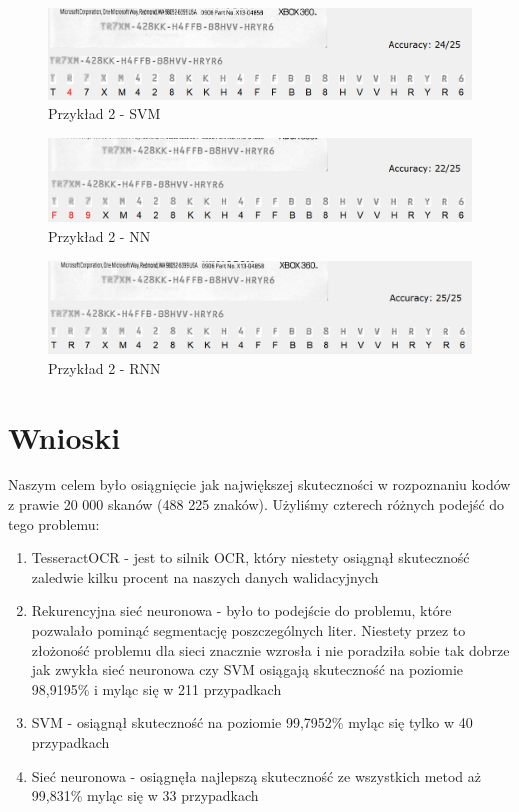 \documentclass[titlepage,10pt,a4paper]{article}
\begin{document}
{{{\begin{figure}[!htbp]
		\centering
		\caption{Przykład 2 - SVM}
		\vspace{1cm}
		\hspace*{-2.8cm}
		\includegraphics[scale=0.52]{sample2_svm.png}
	\end{figure}
	{\begin{figure}[!htbp]
			\centering
			\caption{Przykład 2 - NN}
			\vspace{1cm}
			\hspace*{-2.8cm}
			\includegraphics[scale=0.52]{sample2_nn.png}
		\end{figure}
	}
	{\begin{figure}[!htbp]
			\centering
			\caption{Przykład 2 - RNN}
			\vspace{1cm}
			\hspace*{-2.8cm}
			\includegraphics[scale=0.52]{sample2_rnn.png}
		\end{figure}
\pagebreak
\section{Wnioski}
Naszym celem było osiągnięcie jak największej skuteczności w rozpoznaniu kodów z prawie 20 000 skanów (488 225 znaków). Użyliśmy czterech różnych podejść do tego problemu:

\begin{enumerate}
	\item TesseractOCR - jest to silnik OCR, który niestety osiągnął skuteczność zaledwie kilku procent na naszych danych walidacyjnych
	\item Rekurencyjna sieć neuronowa - było to podejście do problemu, które pozwalało pominąć segmentację poszczególnych liter. Niestety przez to złożoność problemu dla sieci znacznie wzrosła i nie poradziła sobie tak dobrze jak zwykła sieć neuronowa czy SVM osiągają skuteczność na poziomie 98,9195\% i myląc się w 211 przypadkach
	\item SVM - osiągnął skuteczność na poziomie 99,7952\% myląc się tylko w 40 przypadkach
	\item Sieć neuronowa - osiągnęła najlepszą skuteczność ze wszystkich metod aż 99,831\% myląc się w 33 przypadkach
\end{enumerate}

}}}}
\end{document}
